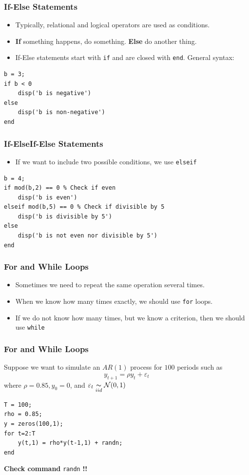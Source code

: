 \documentclass[11pt,xcolor={svgnames},aspectratio=169,usepdftitle=false,notheorems]{beamer}
\begin{document}
\begin{frame}[fragile]
    \frametitle{If-Else Statements}
    \begin{itemize}
        \item Typically, relational and logical operators are used as conditions.
        \item \alert{\textbf{If}} something happens, do something. \alert{\textbf{Else}} do another thing.
        \item If-Else statements start with \verb;if; and are closed with \verb;end;. General syntax:
    \end{itemize}
\begin{lstlisting}
b = 3;
if b < 0
    disp('b is negative')
else
    disp('b is non-negative')
end
\end{lstlisting}
\end{frame}

\begin{frame}[fragile]
    \frametitle{If-ElseIf-Else Statements}
\begin{itemize}
    \item If we want to include two possible conditions, we use \verb;elseif;
\end{itemize}
\begin{lstlisting}
b = 4;
if mod(b,2) == 0 % Check if even
    disp('b is even')
elseif mod(b,5) == 0 % Check if divisible by 5
    disp('b is divisible by 5')
else
    disp('b is not even nor divisible by 5')
end
\end{lstlisting}
\end{frame}

\begin{frame}[fragile]
    \frametitle{For and While Loops}
\begin{itemize}
    \item Sometimes we need to repeat the same operation several times.
    \item When we know how many times exactly, we should use \verb;for; loops.
    \item If we do not know how many times, but we know a criterion, then we should use \verb;while;
\end{itemize}
\end{frame}

\begin{frame}[fragile]
    \frametitle{For and While Loops}
Suppose we want to simulate an $AR(1)$ process for $100$ periods such as
\[
y_{t+1} = \rho y_t + \varepsilon_t
\]
where $\rho = 0.85,y_0 = 0$, and $\varepsilon_t \underset{iid}{\thicksim} \mathcal{N}(0,1)$

\begin{lstlisting}
T = 100;
rho = 0.85;
y = zeros(100,1);
for t=2:T
    y(t,1) = rho*y(t-1,1) + randn;
end
\end{lstlisting}
\alert{\textbf{Check command}} \verb;randn; \alert{\textbf{!!}}
\end{frame}
\end{document}
